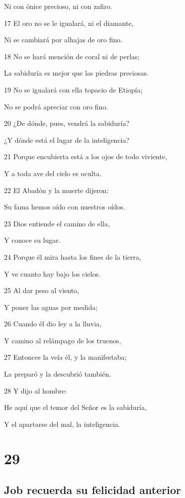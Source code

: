 \par Ni con ónice precioso, ni con zafiro.
\par 17 El oro no se le igualará, ni el diamante,
\par Ni se cambiará por alhajas de oro fino.
\par 18 No se hará mención de coral ni de perlas;
\par La sabiduría es mejor que las piedras preciosas.
\par 19 No se igualará con ella topacio de Etiopía;
\par No se podrá apreciar con oro fino.
\par 20 ¿De dónde, pues, vendrá la sabiduría?
\par ¿Y dónde está el lugar de la inteligencia?
\par 21 Porque encubierta está a los ojos de todo viviente,
\par Y a toda ave del cielo es oculta.
\par 22 El Abadón y la muerte dijeron:
\par Su fama hemos oído con nuestros oídos.
\par 23 Dios entiende el camino de ella,
\par Y conoce su lugar.
\par 24 Porque él mira hasta los fines de la tierra,
\par Y ve cuanto hay bajo los cielos.
\par 25 Al dar peso al viento,
\par Y poner las aguas por medida;
\par 26 Cuando él dio ley a la lluvia,
\par Y camino al relámpago de los truenos,
\par 27 Entonces la veía él, y la manifestaba;
\par La preparó y la descubrió también.
\par 28 Y dijo al hombre:
\par He aquí que el temor del Señor es la sabiduría, 
\par Y el apartarse del mal, la inteligencia.

\chapter{29}

\section*{Job recuerda su felicidad anterior}

